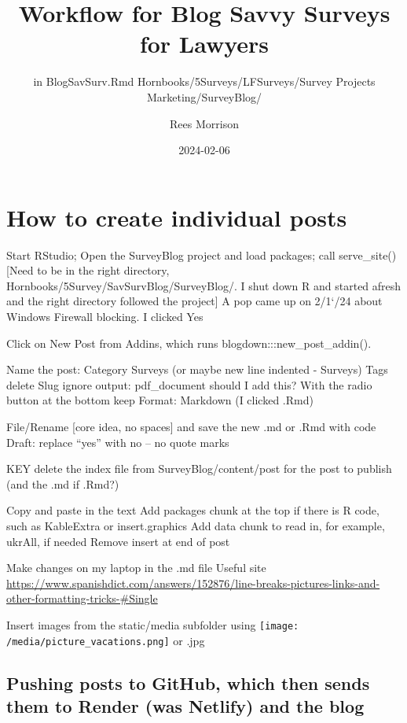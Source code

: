 \documentclass[
]{article}
\title{Workflow for Blog Savvy Surveys for Lawyers}
\subtitle{in BlogSavSurv.Rmd Hornbooks/5Surveys/LFSurveys/Survey
Projects Marketing/SurveyBlog/}
\author{Rees Morrison}
\date{2024-02-06}
\begin{document}
\maketitle

\hypertarget{how-to-create-individual-posts}{%
\section{How to create individual
posts}\label{how-to-create-individual-posts}}

Start RStudio; Open the SurveyBlog project and load packages; call
serve\_site() {[}Need to be in the right directory,
Hornbooks/5Survey/SavSurvBlog/SurveyBlog/. I shut down R and started
afresh and the right directory followed the project{]} A pop came up on
2/1`/24 about Windows Firewall blocking. I clicked Yes

Click on New Post from Addins, which runs blogdown:::new\_post\_addin().

Name the post: Category Surveys (or maybe new line indented - Surveys)
Tags delete Slug ignore output: pdf\_document should I add this? With
the radio button at the bottom keep Format: Markdown (I clicked .Rmd)

File/Rename {[}core idea, no spaces{]} and save the new .md or .Rmd with
code Draft: replace ``yes'' with no -- no quote marks

KEY delete the index file from SurveyBlog/content/post for the post to
publish (and the .md if .Rmd?)

Copy and paste in the text Add packages chunk at the top if there is R
code, such as KableExtra or insert.graphics Add data chunk to read in,
for example, ukrAll, if needed Remove \newpage insert at end of post

Make changes on my laptop in the .md file Useful site
\url{https://www.spanishdict.com/answers/152876/line-breaks-pictures-links-and-other-formatting-tricks-\#Single}

Insert images from the static/media subfolder using
\texttt{[image: /media/picture\_vacations.png]} or .jpg

\hypertarget{pushing-posts-to-github-which-then-sends-them-to-render-was-netlify-and-the-blog}{%
\subsection{Pushing posts to GitHub, which then sends them to Render
(was Netlify) and the
blog}\label{pushing-posts-to-github-which-then-sends-them-to-render-was-netlify-and-the-blog}}
\end{document}
